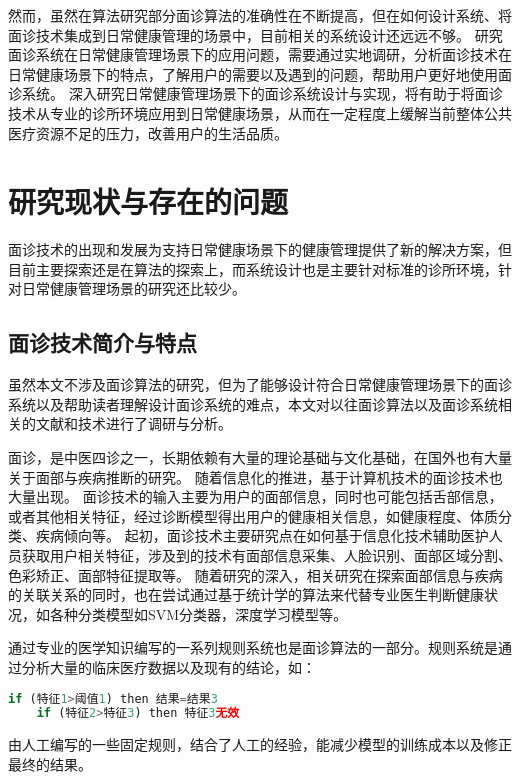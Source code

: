 然而，虽然在算法研究部分面诊算法的准确性在不断提高，但在如何设计系统、将面诊技术集成到日常健康管理的场景中，目前相关的系统设计还远远不够。
研究面诊系统在日常健康管理场景下的应用问题，需要通过实地调研，分析面诊技术在日常健康场景下的特点，了解用户的需要以及遇到的问题，帮助用户更好地使用面诊系统。
深入研究日常健康管理场景下的面诊系统设计与实现，将有助于将面诊技术从专业的诊所环境应用到日常健康场景，从而在一定程度上缓解当前整体公共医疗资源不足的压力，改善用户的生活品质。

\section{研究现状与存在的问题}

面诊技术的出现和发展为支持日常健康场景下的健康管理提供了新的解决方案，但目前主要探索还是在算法的探索上，而系统设计也是主要针对标准的诊所环境，针对日常健康管理场景的研究还比较少。

\subsection{面诊技术简介与特点}
虽然本文不涉及面诊算法的研究，但为了能够设计符合日常健康管理场景下的面诊系统以及帮助读者理解设计面诊系统的难点，本文对以往面诊算法以及面诊系统相关的文献和技术进行了调研与分析。

面诊，是中医四诊之一，长期依赖有大量的理论基础与文化基础，在国外也有大量关于面部与疾病推断的研究。
随着信息化的推进，基于计算机技术的面诊技术也大量出现。
面诊技术的输入主要为用户的面部信息，同时也可能包括舌部信息，或者其他相关特征，经过诊断模型得出用户的健康相关信息，如健康程度、体质分类、疾病倾向等。
起初，面诊技术主要研究点在如何基于信息化技术辅助医护人员获取用户相关特征，涉及到的技术有面部信息采集、人脸识别、面部区域分割、色彩矫正、面部特征提取等。
随着研究的深入，相关研究在探索面部信息与疾病的关联关系的同时，也在尝试通过基于统计学的算法来代替专业医生判断健康状况，如各种分类模型如SVM分类器，深度学习模型等\cite{林锋2019中医面诊系统调研报告}。

通过专业的医学知识编写的一系列规则系统也是面诊算法的一部分。规则系统是通过分析大量的临床医疗数据以及现有的结论，如：

\begin{lstlisting}[language={Python}, title=诊断规则]
    if (特征1>阈值1) then 结果=结果3
    if (特征2>特征3) then 特征3无效
\end{lstlisting}

由人工编写的一些固定规则，结合了人工的经验，能减少模型的训练成本以及修正最终的结果。

